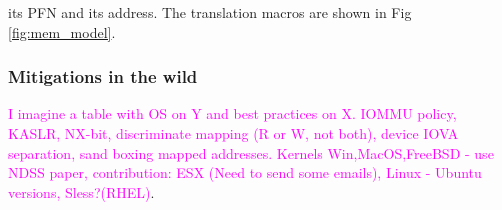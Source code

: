 its PFN and its \page address. The translation macros are shown in Fig \ref{fig:mem_model}.  

\begin{comment}
\textcolor{olive}{
\subsection{breaking kaslr with leaked pointers}
Please make prev section coherent...
\begin{itemize}
    \item PUD alignment
    \item page\_offset\_base
    \item vmemmap\_base
    \item kernel text offset
\end{itemize}}
\end{comment}

\subsubsection{Mitigations in the wild}
\textcolor{magenta}{I imagine a table with OS on Y and best practices on X.
IOMMU policy, KASLR, NX-bit, discriminate mapping (R or W, not both), device IOVA separation, sand boxing mapped addresses.
Kernels Win,MacOS,FreeBSD - use NDSS paper, contribution: ESX (Need to send some emails), Linux - Ubuntu versions, Sless?(RHEL)}.